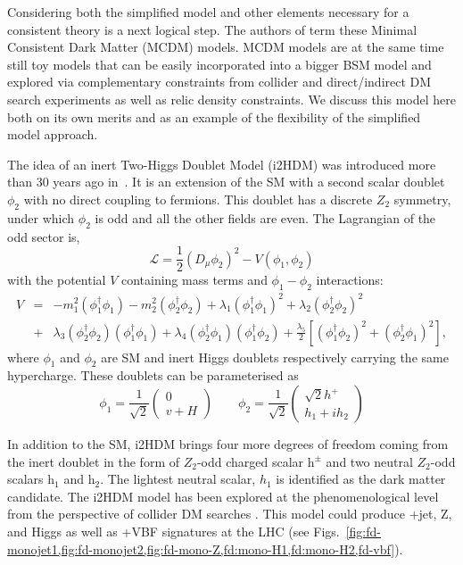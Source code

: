 Considering both the simplified model and other elements necessary for a consistent theory is a next logical step. The authors of \cite{Belyaev:2015tap} term these Minimal
Consistent Dark Matter (MCDM) models. MCDM models are at the same time still toy models that can be 
easily incorporated into a bigger BSM model and explored via
complementary constraints from collider and direct/indirect DM search
experiments as well as relic density constraints. We discuss this model here both on its own merits and as an example of the flexibility of the simplified model approach.

The idea of an inert Two-Higgs Doublet Model (i2HDM) was introduced
more than 30 years ago in~\cite{Deshpande:1977rw,LopezHonorez:2006gr,Dolle:2009fn,Goudelis:2013uca,Balyaev:2015tap}. It is an extension of the SM with a second scalar doublet $\phi_2$ with no direct coupling to fermions.  This doublet has a discrete $Z_2$ symmetry, under which $\phi_2$ is odd and all the other fields are even. 
The Lagrangian of the odd sector is,
  \begin{equation}
  \mathcal{L} = \frac{1}{2}(D_{\mu}\phi_2)^2 -V(\phi_1,\phi_2)
  \end{equation}
with the  potential $V$  containing mass terms and $\phi_1 - \phi_2$
interactions:
\begin{eqnarray}
  V &=& -m_1^2 (\phi_1^{\dagger}\phi_1) - m_2^2 (\phi_2^{\dagger}\phi_2) + \lambda_1 (\phi_1^{\dagger}\phi_1)^2 + \lambda_2 (\phi_2^{\dagger}\phi_2)^2    \nonumber  \\
  &+&  \lambda_3(\phi_2^{\dagger}\phi_2)(\phi_1^{\dagger}\phi_1)  + \lambda_4(\phi_2^{\dagger}\phi_1)(\phi_1^{\dagger}\phi_2) + 
  \frac{\lambda_5}{2}\left[(\phi_1^{\dagger}\phi_2)^2 + (\phi_2^{\dagger}\phi_1)^2 \right],
\end{eqnarray}
where $\phi_1$ and  $\phi_2$ are SM and inert Higgs doublets respectively carrying the same hypercharge. These doublets can be parameterised as
\begin{equation}
\phi_1=\frac{1}{\sqrt{2}}
\begin{pmatrix}
0\\
v+H 
\end{pmatrix}
  \qquad
  \phi_2= \frac{1}{\sqrt{2}}
\begin{pmatrix}
 \sqrt{2}{h^+} \\
 h_1 + ih_2
\end{pmatrix}
\end{equation}

In addition to the SM, i2HDM brings four more degrees of
freedom coming from the inert doublet in the form of $Z_2$-odd charged
scalar $\textrm{h}^\pm$ and two neutral $Z_2$-odd scalars
$\textrm{h}_1$ and $\textrm{h}_2$. The lightest neutral scalar, $h_1$
is identified as the dark matter candidate. The i2HDM model has been explored at the
phenomenological level from the perspective of collider DM searches
\cite{Burgess:2000yq, Andreas:2008xy, Arhrib:2013ela, Belyaev:2015tap}. This model could produce \MET+jet, Z, and Higgs as well as \MET+VBF signatures at the LHC (see Figs.~\ref{fig:fd-monojet1,fig:fd-monojet2,fig:fd-mono-Z,fd:mono-H1,fd:mono-H2,fd-vbf}).

